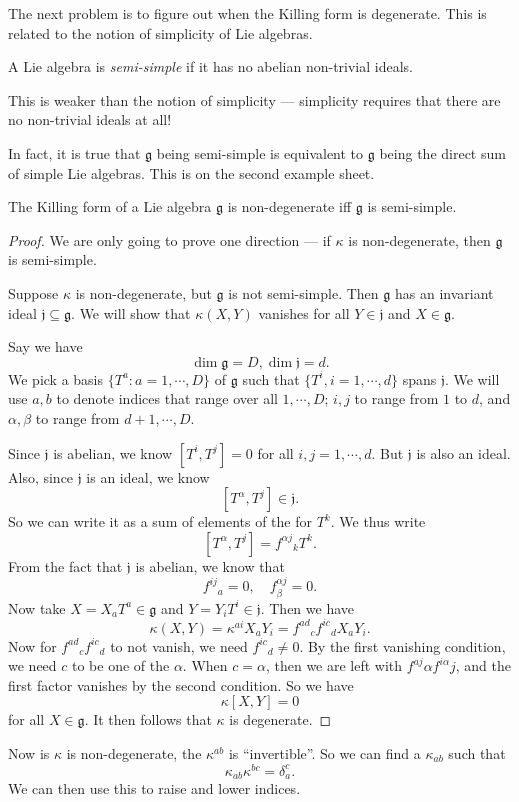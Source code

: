 \documentclass[a4paper]{article}
\begin{document}
The next problem is to figure out when the Killing form is degenerate. This is related to the notion of simplicity of Lie algebras.

\begin{defi}
  A Lie algebra is \emph{semi-simple} if it has no abelian non-trivial ideals.
\end{defi}
This is weaker than the notion of simplicity --- simplicity requires that there are no non-trivial ideals at all!

In fact, it is true that $\mathfrak{g}$ being semi-simple is equivalent to $\mathfrak{g}$ being the direct sum of simple Lie algebras. This is on the second example sheet.
\begin{thm}[Cartan]
  The Killing form of a Lie algebra $\mathfrak{g}$ is non-degenerate iff $\mathfrak{g}$ is semi-simple.
\end{thm}

\begin{proof}
  We are only going to prove one direction --- if $\kappa$ is non-degenerate, then $\mathfrak{g}$ is semi-simple.

  Suppose $\kappa$ is non-degenerate, but $\mathfrak{g}$ is not semi-simple. Then $\mathfrak{g}$ has an invariant ideal $\mathfrak{j} \subseteq \mathfrak{g}$. We will show that $\kappa(X, Y)$ vanishes for all $Y \in \mathfrak{j}$ and $X \in \mathfrak{g}$.

  Say we have
  \[
    \dim \mathfrak{g} = D, \dim \mathfrak{j} = d.
  \]
  We pick a basis $\{T^a: a = 1, \cdots, D\}$ of $\mathfrak{g}$ such that $\{T^i, i = 1, \cdots, d\}$ spans $\mathfrak{j}$. We will use $a, b$ to denote indices that range over all $1, \cdots, D$; $i, j$ to range from $1$ to $d$, and $\alpha, \beta$ to range from $d + 1, \cdots, D$.

  Since $\mathfrak{j}$ is abelian, we know $[T^i, T^j] = 0$ for all $i, j = 1, \cdots, d$. But $\mathfrak{j}$ is also an ideal. Also, since $\mathfrak{j}$ is an ideal, we know
  \[
    [T^\alpha, T^j] \in \mathfrak{j}.
  \]
  So we can write it as a sum of elements of the for $T^k$. We thus write
  \[
    [T^\alpha, T^j] = f^{\alpha j}\!_k T^k.
  \]
  From the fact that $\mathfrak{j}$ is abelian, we know that
  \[
    f^{ij}\!_a = 0,\quad f^{\alpha j}_{\beta} = 0.
  \]
  Now take $X = X_a T^a \in \mathfrak{g}$ and $Y = Y_i T^i \in \mathfrak{j}$. Then we have
  \[
    \kappa(X, Y) = \kappa^{ai}X_a Y_i = f^{ad}\!_c f^{ic}\!_d X_a Y_i.
  \]
  Now for $f^{ad}\!_c f^{ic}\!_d$ to not vanish, we need $f^{ic}\!_d \not= 0$. By the first vanishing condition, we need $c$ to be one of the $\alpha$. When $c = \alpha$, then we are left with $f^{aj}\alpha f^{i\alpha}j$, and the first factor vanishes by the second condition. So we have
  \[
    \kappa[X, Y] = 0
  \]
  for all $X \in \mathfrak{g}$. It then follows that $\kappa$ is degenerate.
\end{proof}
Now is $\kappa$ is non-degenerate, the $\kappa^{ab}$ is ``invertible''. So we can find a $\kappa_{ab}$ such that
\[
  \kappa_{ab}\kappa^{bc} = \delta_a^c.
\]
We can then use this to raise and lower indices.
\end{document}
